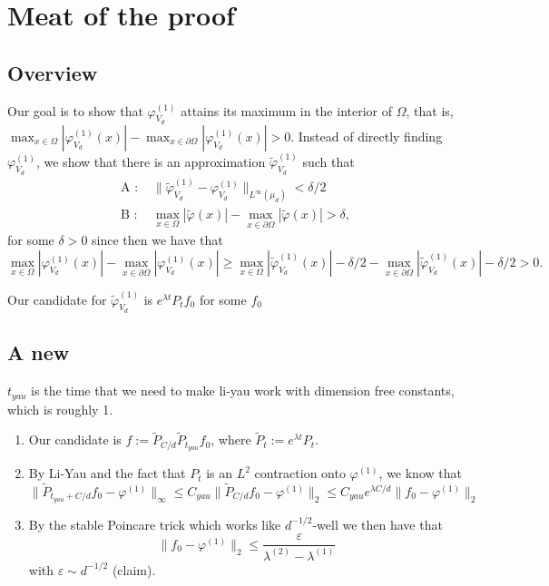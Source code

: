 \section{Meat of the proof}

\subsection{Overview}

Our goal is to show that \( \varphi^{(1)}_{V_d} \) attains its maximum in the interior of \( \Omega \), that is, \( \max_{x \in \Omega} |\varphi^{(1)}_{V_d}(x)| - \max_{x \in \partial\Omega} |\varphi^{(1)}_{V_d}(x)| > 0 \). Instead of directly finding \( \varphi^{(1)}_{V_d} \), we show that there is an approximation \( \tilde \varphi^{(1)}_{V_d} \) such that
\begin{align*}
    \text{A : } &\|\tilde\varphi^{(1)}_{V_d} - \varphi^{(1)}_{V_d}\|_{L^\infty(\mu_d)} < \delta/2 \\
    \text{B : } &\max_{x \in \Omega} |\tilde{\varphi}(x)| - \max_{x \in \partial\Omega} |\tilde{\varphi}(x)| > \delta,
\end{align*}
for some \( \delta > 0\) since then we have that
\[
    \max_{x \in \Omega} |\varphi^{(1)}_{V_d}(x)| - \max_{x \in \partial\Omega} |\varphi^{(1)}_{V_d}(x)|
    \geq \max_{x \in \Omega} |\tilde\varphi^{(1)}_{V_d}(x)| - \delta/2 - \max_{x \in \partial\Omega} |\tilde\varphi^{(1)}_{V_d}(x)| - \delta/2
    > 0.
\]

Our candidate for \( \tilde\varphi^{(1)}_{V_d} \) is \( e^{\lambda t} P_t f_0 \) for some \( f_0 \)



\subsection{A new}

$t_{yau}$ is the time that we need to make li-yau work with dimension free constants, which is roughly 1.

\begin{enumerate}
    \item Our candidate is $f := \tilde P_{C/d}\tilde P_{t_{yau}} f_0$, where $\tilde P_t := e^{\lambda t}P_t$.
    \item By Li-Yau and the fact that $P_t$ is an $L^2$ contraction onto \( \varphi^{(1)} \), we know that \[ \|\tilde P_{t_{yau}+C/d} f_0- \varphi^{(1)}\|_\infty \le C_{yau} \|\tilde P_{C/d} f_0- \varphi^{(1)}\|_2 
    \le  C_{yau} e^{\lambda C/d} \| f_0 - \varphi^{(1)}\|_2 \]
    \item By the stable Poincare trick which works like $d^{-1/2}$-well we then have that
    $$
    \|f_0 - \varphi^{(1)}\|_2  \le \frac{\varepsilon}{\lambda^{(2)}-\lambda^{(1)}}
    $$
    with \( \varepsilon \sim d^{-1/2} \) (claim).
\end{enumerate}

